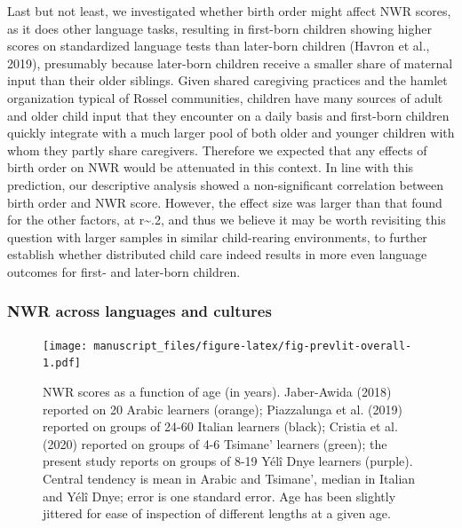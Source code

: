 \documentclass[english,,man,floatsintext]{apa6}
\begin{document}
Last but not least, we investigated whether birth order might affect NWR scores, as it does other language tasks, resulting in first-born children showing higher scores on standardized language tests than later-born children (Havron et al., 2019), presumably because later-born children receive a smaller share of maternal input than their older siblings. Given shared caregiving practices and the hamlet organization typical of Rossel communities, children have many sources of adult and older child input that they encounter on a daily basis and first-born children quickly integrate with a much larger pool of both older and younger children with whom they partly share caregivers. Therefore we expected that any effects of birth order on NWR would be attenuated in this context. In line with this prediction, our descriptive analysis showed a non-significant correlation between birth order and NWR score. However, the effect size was larger than that found for the other factors, at r\textasciitilde{}.2, and thus we believe it may be worth revisiting this question with larger samples in similar child-rearing environments, to further establish whether distributed child care indeed results in more even language outcomes for first- and later-born children.

\hypertarget{nwr-across-languages-and-cultures}{%
\subsubsection{NWR across languages and cultures}\label{nwr-across-languages-and-cultures}}

\begin{figure}
\centering
\texttt{[image: manuscript\_files/figure-latex/fig-prevlit-overall-1.pdf]}
\caption{\label{fig:fig-prevlit-overall}NWR scores as a function of age (in years). Jaber-Awida (2018) reported on 20 Arabic learners (orange); Piazzalunga et al. (2019) reported on groups of 24-60 Italian learners (black); Cristia et al. (2020) reported on groups of 4-6 Tsimane' learners (green); the present study reports on groups of 8-19 Yélî Dnye learners (purple). Central tendency is mean in Arabic and Tsimane', median in Italian and Yélî Dnye; error is one standard error. Age has been slightly jittered for ease of inspection of different lengths at a given age.}
\end{figure}
\end{document}
